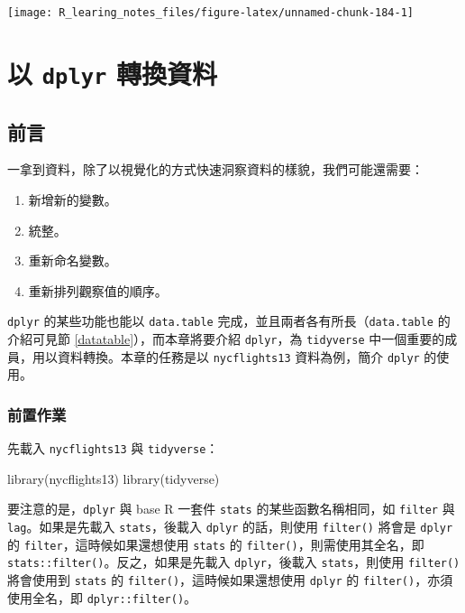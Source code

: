 \documentclass[
]{book}
\newenvironment{Shaded}{\begin{snugshade}}{\end{snugshade}}
\newcommand{\FunctionTok}[1]{\textcolor[rgb]{0.00,0.00,0.00}{#1}}
\newcommand{\NormalTok}[1]{#1}
\theoremstyle{definition}
\theoremstyle{remark}
\begin{document}
\begin{center}\texttt{[image: R\_learing\_notes\_files/figure-latex/unnamed-chunk-184-1]} \end{center}

\hypertarget{dplyr}{%
\chapter{\texorpdfstring{以 \texttt{dplyr} 轉換資料}{以 dplyr 轉換資料}}\label{dplyr}}

\hypertarget{ux524dux8a00}{%
\section{前言}\label{ux524dux8a00}}

一拿到資料，除了以視覺化的方式快速洞察資料的樣貌，我們可能還需要：

\begin{enumerate}
\def\labelenumi{\arabic{enumi}.}
\item
  新增新的變數。
\item
  統整。
\item
  重新命名變數。
\item
  重新排列觀察值的順序。
\end{enumerate}

\texttt{dplyr} 的某些功能也能以 \texttt{data.table} 完成，並且兩者各有所長（\texttt{data.table} 的介紹可見節 \ref{datatable}），而本章將要介紹 \texttt{dplyr}，為 \texttt{tidyverse} 中一個重要的成員，用以資料轉換。本章的任務是以 \texttt{nycflights13} 資料為例，簡介 \texttt{dplyr} 的使用。

\hypertarget{ux524dux7f6eux4f5cux696d-1}{%
\subsection{前置作業}\label{ux524dux7f6eux4f5cux696d-1}}

先載入 \texttt{nycflights13} 與 \texttt{tidyverse}：

\begin{Shaded}
\begin{Highlighting}[]
\FunctionTok{library}\NormalTok{(nycflights13)}
\FunctionTok{library}\NormalTok{(tidyverse)}
\end{Highlighting}
\end{Shaded}

要注意的是，\texttt{dplyr} 與 base R 一套件 \texttt{stats} 的某些函數名稱相同，如 \texttt{filter} 與 \texttt{lag}。如果是先載入 \texttt{stats}，後載入 \texttt{dplyr} 的話，則使用 \texttt{filter()} 將會是 \texttt{dplyr} 的 \texttt{filter}，這時候如果還想使用 \texttt{stats} 的 \texttt{filter()}，則需使用其全名，即 \texttt{stats::filter()}。反之，如果是先載入 \texttt{dplyr}，後載入 \texttt{stats}，則使用 \texttt{filter()} 將會使用到 \texttt{stats} 的 \texttt{filter()}，這時候如果還想使用 \texttt{dplyr} 的 \texttt{filter()}，亦須使用全名，即 \texttt{dplyr::filter()}。
\end{document}
